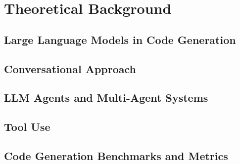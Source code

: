 \chapter{Theoretical Background}
\label{chap:background}

\section{Large Language Models in Code Generation}
\label{sec:background-llm-codegen}

\section{Conversational Approach}
\label{sec:background-conversational}

\section{LLM Agents and Multi-Agent Systems}
\label{sec:background-agents}

\section{Tool Use}
\label{sec:background-tool-use}

\section{Code Generation Benchmarks and Metrics}
\label{sec:background-benchmarks-metrics}
